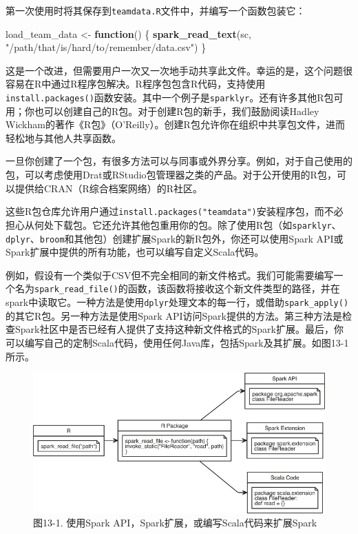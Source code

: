 \documentclass[
]{article}
\newenvironment{Shaded}{\begin{snugshade}}{\end{snugshade}}
\newcommand{\ControlFlowTok}[1]{\textcolor[rgb]{0.13,0.29,0.53}{\textbf{#1}}}
\newcommand{\KeywordTok}[1]{\textcolor[rgb]{0.13,0.29,0.53}{\textbf{#1}}}
\newcommand{\NormalTok}[1]{#1}
\newcommand{\StringTok}[1]{\textcolor[rgb]{0.31,0.60,0.02}{#1}}
\begin{document}
第一次使用时将其保存到\texttt{teamdata.R}文件中，并编写一个函数包装它：

\begin{Shaded}
\begin{Highlighting}[]
\NormalTok{load_team_data <-}\StringTok{ }\ControlFlowTok{function}\NormalTok{() \{}
    \KeywordTok{spark_read_text}\NormalTok{(sc, }\StringTok{"/path/that/is/hard/to/remember/data.csv"}\NormalTok{)}
\NormalTok{\}}
\end{Highlighting}
\end{Shaded}

这是一个改进，但需要用户一次又一次地手动共享此文件。幸运的是，这个问题很容易在R中通过R程序包解决。R程序包包含R代码，支持使用\texttt{install.packages()}函数安装。其中一个例子是\texttt{sparklyr}。还有许多其他R包可用；你也可以创建自己的R包。对于创建R包的新手，我们鼓励阅读Hadley
Wickham的著作《R包》（O'Reilly）。创建R包允许你在组织中共享包文件，进而轻松地与其他人共享函数。

一旦你创建了一个包，有很多方法可以与同事或外界分享。例如，对于自己使用的包，可以考虑使用Drat或RStudio包管理器之类的产品。对于公开使用的R包，可以提供给CRAN（R综合档案网络）的R社区。

这些R包仓库允许用户通过\texttt{install.packages("teamdata")}安装程序包，而不必担心从何处下载包。它还允许其他包重用你的包。除了使用R包（如\texttt{sparklyr}、\texttt{dplyr}、\texttt{broom}和其他包）创建扩展Spark的新R包外，你还可以使用Spark
API或Spark扩展中提供的所有功能，也可以编写自定义Scala代码。

例如，假设有一个类似于CSV但不完全相同的新文件格式。我们可能需要编写一个名为\texttt{spark\_read\_file()}的函数，该函数将接收这个新文件类型的路径，并在spark中读取它。一种方法是使用\texttt{dplyr}处理文本的每一行，或借助\texttt{spark\_apply()}的其它R包。另一种方法是使用Spark
API访问Spark提供的方法。第三种方法是检查Spark社区中是否已经有人提供了支持这种新文件格式的Spark扩展。最后，你可以编写自己的定制Scala代码，使用任何Java库，包括Spark及其扩展。如图13-1所示。

\begin{figure}
\centering
\includegraphics{figures/13_1.png}
\caption{图13-1. 使用Spark API，Spark扩展，或编写Scala代码来扩展Spark}
\end{figure}
\end{document}
